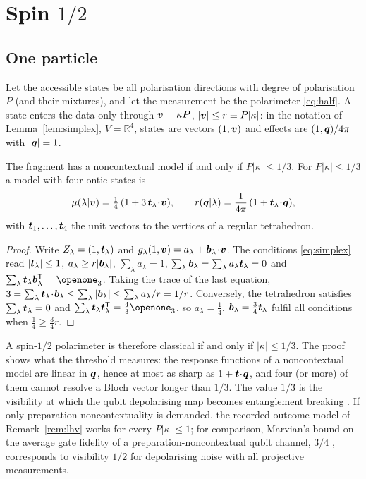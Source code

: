 \section{Spin $1/2$}
\label{sec:half}

\subsection{One particle}

Let the accessible states be all polarisation directions with degree of polarisation $P$ (and their mixtures), and let the measurement be the polarimeter \eqref{eq:half}. A state enters the data only through $\bm{v}=\kappa\bm{P}$, $|\bm{v}|\le r\equiv P|\kappa|$: in the notation of Lemma~\ref{lem:simplex}, $V=\mathbb{R}^4$, states are vectors $(1,\bm{v})$ and effects are $(1,\bm{q})/4\pi$ with $|\bm{q}|=1$.

\begin{theorem}
\label{thm:half}
The fragment has a noncontextual model if and only if $P|\kappa|\le1/3$. For $P|\kappa|\le1/3$ a model with four ontic states is
\begin{equation}
\mu(\lambda|\bm{v})=\tfrac14\,(1+3\,\bm{t}_\lambda\!\cdot\!\bm{v}),\qquad r(\bm{q}|\lambda)=\frac{1}{4\pi}\,(1+\bm{t}_\lambda\!\cdot\!\bm{q}),
\label{eq:tetra}
\end{equation}
with $\bm{t}_1,\dots,\bm{t}_4$ the unit vectors to the vertices of a regular tetrahedron.
\end{theorem}

\begin{proof}
Write $Z_\lambda=(1,\bm{t}_\lambda)$ and $g_\lambda(1,\bm{v})=a_\lambda+\bm{b}_\lambda\!\cdot\!\bm{v}$. The conditions \eqref{eq:simplex} read $|\bm{t}_\lambda|\le1$, $a_\lambda\ge r|\bm{b}_\lambda|$, $\sum_\lambda a_\lambda=1$, $\sum_\lambda\bm{b}_\lambda=\sum_\lambda a_\lambda\bm{t}_\lambda=0$ and $\sum_\lambda\bt_\lambda\bb_\lambda^{\T}=\openone_3$. Taking the trace of the last equation, $3=\sum_\lambda\bm{t}_\lambda\!\cdot\!\bm{b}_\lambda\le\sum_\lambda|\bm{b}_\lambda|\le\sum_\lambda a_\lambda/r=1/r$. Conversely, the tetrahedron satisfies $\sum_\lambda\bm{t}_\lambda=0$ and $\sum_\lambda\bt_\lambda\bt_\lambda^{\T}=\tfrac43\openone_3$, so $a_\lambda=\tfrac14$, $\bm{b}_\lambda=\tfrac34\bm{t}_\lambda$ fulfil all conditions when $\tfrac14\ge\tfrac34r$.
\end{proof}

A spin-$1/2$ polarimeter is therefore classical if and only if $|\kappa|\le1/3$. The proof shows what the threshold measures: the response functions of a noncontextual model are linear in $\bm{q}$, hence at most as sharp as $1+\bm{t}\!\cdot\!\bm{q}$, and four (or more) of them cannot resolve a Bloch vector longer than $1/3$. The value $1/3$ is the visibility at which the qubit depolarising map becomes entanglement breaking \cite{horodeckiEB2003,ruskai2003}. If only preparation noncontextuality is demanded, the recorded-outcome model of Remark~\ref{rem:lhv} works for every $P|\kappa|\le1$; for comparison, Marvian's bound on the average gate fidelity of a preparation-noncontextual qubit channel, $3/4$ \cite{marvian2020}, corresponds to visibility $1/2$ for depolarising noise with all projective measurements.

